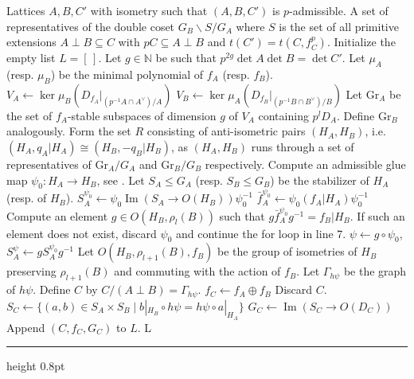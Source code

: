 \documentclass[a4paper]{amsart}
\makeatletter
\theoremstyle{definition}
\theoremstyle{plain}
\DeclareMathOperator{\image}{Im}
\newcommand{\NN}{\mathbb{N}}
\newcommand{\Gr}{\mathrm{Gr}}
\newcommand{\disc}[1]{{D_{#1}}}
\newcommand{\im}{\operatorname{Im}}
\def\hrulefill{\leavevmode\leaders\hrule height 0.8pt\hfill\kern\z@}
\makeatother
\begin{document}
\begingroup
{}\label{alg:extensions}
\endgroup
\begin{algorithmic}[1]
\REQUIRE Lattices $A,B,C'$ with isometry such that $(A,B,C')$ is $p$-admissible.
\ENSURE
  A set of representatives of the double coset $G_B \backslash S {/}G_A$ where
$S$ is the set of all primitive extensions $A\perp B\subseteq C$ with $pC \subseteq A \perp B$ and $t(C') = t(C,f_C^p)$.
\STATE Initialize the empty list $L = [\,]$.
\STATE Let $g \in \NN$ be such that $p^{2g}  \det A  \det B = \det C'$. \label{alg:extensions_g}
\STATE Let $\mu_A$ (resp. $\mu_B$)
be the minimal polynomial of $f_A$ (resp. $f_B$).
\STATE $V_A \gets \ker \mu_B(D_{f_A}|_{(p^{-1} A \cap A^\vee)/A})$
\STATE $V_B \gets \ker \mu_A(D_{f_B}|_{(p^{-1} B \cap B^\vee)/B})$
\STATE Let $\Gr_A$ be the set of $f_A$-stable subspaces of dimension $g$ of $V_A$ containing $p^l D_A$. Define $\Gr_B$ analogously.
Form the set $R$ consisting of anti-isometric pairs $(H_A,H_B)$, i.e.
$(H_A,q_A|H_A) \cong (H_B,-q_B|H_B)$,
as $(H_A,H_B)$ runs through a set of representatives of
  $\Gr_A/G_A$ and $\Gr_B/G_B$ respectively.
\label{HAHB}
  \STATE Compute an admissible glue map $\psi_0\colon H_A \to H_B$, see . \label{discard_psi1}
  \STATE Let $S_A\leq G_A$ (resp. $S_B \leq G_B$) be the stabilizer of $H_A$ (resp. of $H_B$).
  \STATE $S_A^{\psi_0}\gets \psi_0 \im(S_A\to O(H_B)) \psi_0^{-1}$
  \STATE $\bar f_A^{\psi_0} \gets \psi_0 (f_A|H_A)\psi_0^{-1}$
  \STATE Compute an element $g \in O(H_B,\rho_l(B))$ such that $g \bar f_A^{\psi_0} g^{-1} = f_B|H_B$. If such an element does not exist, discard $\psi_0$ and continue the for loop in line 7. \label{discard_psi2}
  \STATE $\psi \gets g \circ \psi_0$, $S_A^\psi \gets gS_A^{\psi_0}g^{-1}$
  \STATE Let $O(H_B,\rho_{l+1}(B),f_B)$ be the group of isometries of $H_B$ preserving $\rho_{l+1}(B)$ and  commuting with the action of $f_B$.
    \STATE Let $\Gamma_{h\psi}$ be the graph of $h\psi$.
    \STATE Define $C$ by $C/(A\perp B) = \Gamma_{h \psi}$.
    \STATE $f_C \gets f_A \oplus f_B$
      \label{keepC?}
      \STATE Discard $C$.
    \ENDIF
    \STATE $S_C \gets\{(a,b) \in S_A \times S_B \mid b|_{H_B} \circ h\psi = h\psi \circ a|_{H_A}\}$ \label{preserveC}
    \STATE $G_C \gets \image\left(S_C \rightarrow O(\disc{C})\right)$
    \STATE Append $(C,f_C,G_C)$ to $L$.
  \ENDFOR
\ENDFOR
\RETURN L
\end{algorithmic}\hrulefill\\
\end{document}
